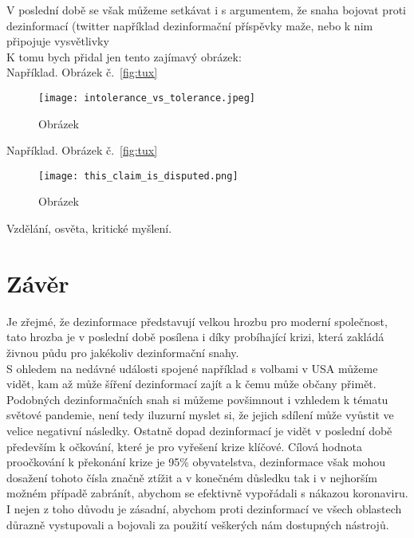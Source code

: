 V poslední době se však můžeme setkávat i s argumentem, že snaha bojovat proti dezinformací (twitter například dezinformační příspěvky maže, nebo k nim připojuje vysvětlivky\\

K tomu bych přidal jen tento zajímavý obrázek:\\

Například. Obrázek č.~\ref{fig:tux}

\begin{figure}[htbp]
  \centering
  \texttt{[image: intolerance\_vs\_tolerance.jpeg]}
  \caption{Obrázek}
  \label{fig:google trends}
\end{figure}

Například. Obrázek č.~\ref{fig:tux}

\begin{figure}[htbp]
  \centering
  \texttt{[image: this\_claim\_is\_disputed.png]}
  \caption{Obrázek}
  \label{fig:google trends}
\end{figure}

Vzdělání, osvěta, kritické myšlení.

\newpage

\section{Závěr}

Je zřejmé, že dezinformace představují velkou hrozbu pro moderní společnost, tato hrozba je v poslední době posílena i díky probíhající krizi, která zakládá živnou půdu pro jakékoliv dezinformační snahy.\\

S ohledem na nedávné události spojené například s volbami v USA můžeme vidět, kam až může šíření dezinformací zajít a k čemu může občany přimět.\\

Podobných dezinformačních snah si můžeme povšimnout i vzhledem k tématu světové pandemie, není tedy iluzurní myslet si, že jejich sdílení může vyůstit ve velice negativní následky. Ostatně dopad dezinformací je vidět v poslední době především k očkování, které je pro vyřešení krize klíčové. Cílová hodnota proočkování k překonání krize je 95\% obyvatelstva, dezinformace však mohou dosažení tohoto čísla značně ztížit a v konečném důsledku tak i v nejhorším možném případě zabránít, abychom se efektivně vypořádali s nákazou koronaviru. I nejen z toho důvodu je zásadní, abychom proti dezinformací ve všech oblastech důrazně vystupovali a bojovali za použití veškerých nám dostupných nástrojů.

